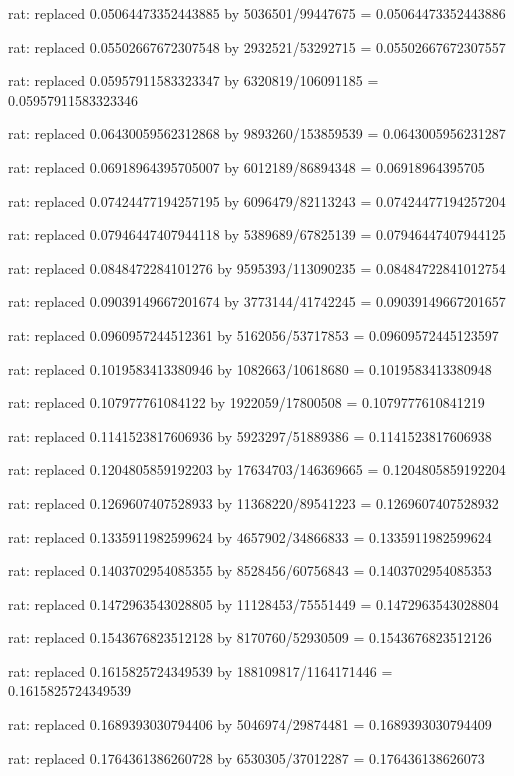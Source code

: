 \documentclass[a4paper,10pt]{article}
\begin{document}
\begin{eulernotebook}
\begin{eulercomment}
\begin{eulercomment}
\begin{eulercomment}
\begin{eulercomment}
\begin{eulercomment}
\begin{eulercomment}
\begin{eulercomment}
\begin{eulercomment}
\begin{eulercomment}
\begin{eulercomment}
\begin{eulercomment}
\begin{eulercomment}
\begin{eulercomment}
\begin{eulercomment}
\begin{eulercomment}
\begin{eulercomment}
\begin{euleroutput}
  rat: replaced 0.05064473352443885 by 5036501/99447675 = 0.05064473352443886
  
  rat: replaced 0.05502667672307548 by 2932521/53292715 = 0.05502667672307557
  
  rat: replaced 0.05957911583323347 by 6320819/106091185 = 0.05957911583323346
  
  rat: replaced 0.06430059562312868 by 9893260/153859539 = 0.0643005956231287
  
  rat: replaced 0.06918964395705007 by 6012189/86894348 = 0.06918964395705
  
  rat: replaced 0.07424477194257195 by 6096479/82113243 = 0.07424477194257204
  
  rat: replaced 0.07946447407944118 by 5389689/67825139 = 0.07946447407944125
  
  rat: replaced 0.0848472284101276 by 9595393/113090235 = 0.08484722841012754
  
  rat: replaced 0.09039149667201674 by 3773144/41742245 = 0.09039149667201657
  
  rat: replaced 0.0960957244512361 by 5162056/53717853 = 0.09609572445123597
  
  rat: replaced 0.1019583413380946 by 1082663/10618680 = 0.1019583413380948
  
  rat: replaced 0.107977761084122 by 1922059/17800508 = 0.1079777610841219
  
  rat: replaced 0.1141523817606936 by 5923297/51889386 = 0.1141523817606938
  
  rat: replaced 0.1204805859192203 by 17634703/146369665 = 0.1204805859192204
  
  rat: replaced 0.1269607407528933 by 11368220/89541223 = 0.1269607407528932
  
  rat: replaced 0.1335911982599624 by 4657902/34866833 = 0.1335911982599624
  
  rat: replaced 0.1403702954085355 by 8528456/60756843 = 0.1403702954085353
  
  rat: replaced 0.1472963543028805 by 11128453/75551449 = 0.1472963543028804
  
  rat: replaced 0.1543676823512128 by 8170760/52930509 = 0.1543676823512126
  
  rat: replaced 0.1615825724349539 by 188109817/1164171446 = 0.1615825724349539
  
  rat: replaced 0.1689393030794406 by 5046974/29874481 = 0.1689393030794409
  
  rat: replaced 0.1764361386260728 by 6530305/37012287 = 0.176436138626073
  

\end{euleroutput}
\end{eulercomment}
\end{eulercomment}
\end{eulercomment}
\end{eulercomment}
\end{eulercomment}
\end{eulercomment}
\end{eulercomment}
\end{eulercomment}
\end{eulercomment}
\end{eulercomment}
\end{eulercomment}
\end{eulercomment}
\end{eulercomment}
\end{eulercomment}
\end{eulercomment}
\end{eulercomment}
\end{eulernotebook}
\end{document}
